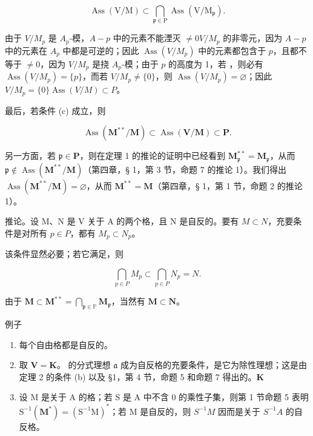 \[
\operatorname{Ass} (\mathrm{V} / \mathrm{M}) \subset \bigcap_ {\mathfrak {p} \in \mathrm{P}} \operatorname{Ass} (\mathrm{V} / \mathrm{M} _ {\mathfrak {p}}).
\]

由于 \(V / M_{p}\) 是 \(A_{p}\)-模，\(A - p\) 中的元素不能湮灭 \(\neq 0\)\(V / M_{p}\) 的非零元，因为 \(A - p\) 中的元素在 \(A_{p}\) 中都是可逆的；因此 \(\operatorname{Ass}(V / M_{p})\) 中的元素都包含于 \(p\)，且都不等于 \(\neq 0\)，因为 \(V / M_{p}\) 是挠 \(A_{p}\)-模；由于 \(p\) 的高度为 1，若 ，则必有 \(\operatorname{Ass}(V / M_{p}) = \{p\}\)，而若 \(V / M_{p} \neq \{0\}\)，则 \(\operatorname{Ass}(V / M_{p}) = \varnothing\)；因此 \(V / M_{p} = \{0\}\)\(\operatorname{Ass}(V / M) \subset P\)。

最后，若条件 (c) 成立，则

\[
\operatorname{Ass} (\mathbf {M} ^ {* *} / \mathbf {M}) \subset \operatorname{Ass} (\mathbf {V} / \mathbf {M}) \subset \mathbf {P}.
\]

另一方面，若 \(\mathfrak{p} \in \mathbf{P}\)，则在定理 1 的推论的证明中已经看到 \(\mathbf{M}_{\mathfrak{p}}^{**} = \mathbf{M}_{\mathfrak{p}}\)，从而 \(\mathfrak{p} \notin \operatorname{Ass}(\mathbf{M}^{**}/\mathbf{M})\)（第四章，§ 1，第 3 节，命题 7 的推论 1）。我们得出 \(\operatorname{Ass}(\mathbf{M}^{**}/\mathbf{M}) = \varnothing\)，从而 \(\mathbf{M}^{**} = \mathbf{M}\)（第四章，§ 1，第 1 节，命题 2 的推论 1）。

推论。设 M、N 是 V 关于 A 的两个格，且 N 是自反的。要有 \(M \subset N\)，充要条件是对所有 \(p \in P\)，都有 \(M_{p} \subset N_{p}\)。

该条件显然必要；若它满足，则

\[
\bigcap_ {p \in P} M _ {p} \subset \bigcap_ {p \in P} N _ {p} = N.
\]

由于 \(\mathbf{M} \subset \mathbf{M}^{**} = \bigcap_{\mathfrak{p} \in \mathbb{P}} \mathbf{M}_{\mathfrak{p}}\)，当然有 \(\mathbf{M} \subset \mathbf{N}\)。

例子

\begin{enumerate}
\def\labelenumi{(\arabic{enumi})}
\item
  每个自由格都是自反的。
\item
  取 \(\mathbf{V} = \mathbf{K}\)。 的分式理想 \(\mathfrak{a}\) 成为自反格的充要条件，是它为除性理想；这是由定理 2 的条件 (b) 以及 §1，第 4 节，命题 5 和命题 7 得出的。\(\mathbf{K}\)
\item
  设 M 是关于 A 的格；若 S 是 A 中不含 0 的乘性子集，则第 1 节命题 5 表明 \(\mathrm{S}^{-1}(\mathbf{M}^{*}) = (\mathrm{S}^{-1}\mathrm{M})^{*}\)；若 M 是自反的，则 \(S^{-1}M\) 因而是关于 \(S^{-1}A\) 的自反格。
\end{enumerate}

